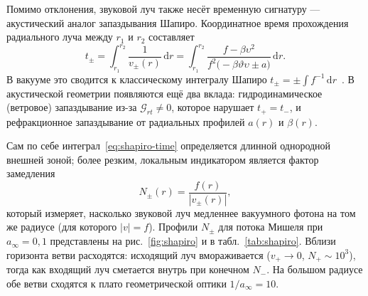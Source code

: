 \documentclass[12pt,a4paper,preprint]{elsarticle}
\begin{document}
            Помимо отклонения, звуковой луч также несёт временную сигнатуру --- акустический аналог запаздывания Шапиро. Координатное время прохождения радиального луча между $r_{1}$ и $r_{2}$ составляет
            \begin{equation}
                t_{\pm} = \int_{r_{1}}^{r_{2}} \frac{1}{v_{\pm}(r)}\,\mathrm{d}r = \int_{r_{1}}^{r_{2}} \frac{f-\beta\upsilon^{2}}{f^{2}\bigl(-\beta\vartheta\upsilon\pm a\bigr)}\,\mathrm{d}r .
                \label{eq:shapiro-time}
            \end{equation}
            В вакууме это сводится к классическому интегралу Шапиро $t_{\pm}=\pm\int f^{-1}\,\mathrm{d}r$~\cite{ShapiroII_FourthTestOfGeneralRelativity_1964}. В акустической геометрии появляются ещё два вклада: гидродинамическое (ветровое) запаздывание из-за $\mathcal{G}_{rt}\neq 0$, которое нарушает $t_{+}=t_{-}$, и рефракционное запаздывание от радиальных профилей $a(r)$ и $\beta(r)$.

            Сам по себе интеграл~\eqref{eq:shapiro-time} определяется длинной однородной внешней зоной; более резким, локальным индикатором является фактор замедления
            \begin{equation}
                N_{\pm}(r) = \frac{f(r)}{|v_{\pm}(r)|} ,
                \label{eq:local-slowdown}
            \end{equation}
            который измеряет, насколько звуковой луч медленнее вакуумного фотона на том же радиусе (для которого $|v|=f$). Профили $N_{\pm}$ для потока Мишеля при $a_{\infty}=0{,}1$ представлены на рис.~\ref{fig:shapiro} и в табл.~\ref{tab:shapiro}. Вблизи горизонта ветви расходятся: исходящий луч вмораживается ($v_{+}\to 0$, $N_{+}\sim 10^{3}$), тогда как входящий луч сметается внутрь при конечном $N_{-}$. На большом радиусе обе ветви сходятся к плато геометрической оптики $1/a_{\infty}=10$.
\end{document}
